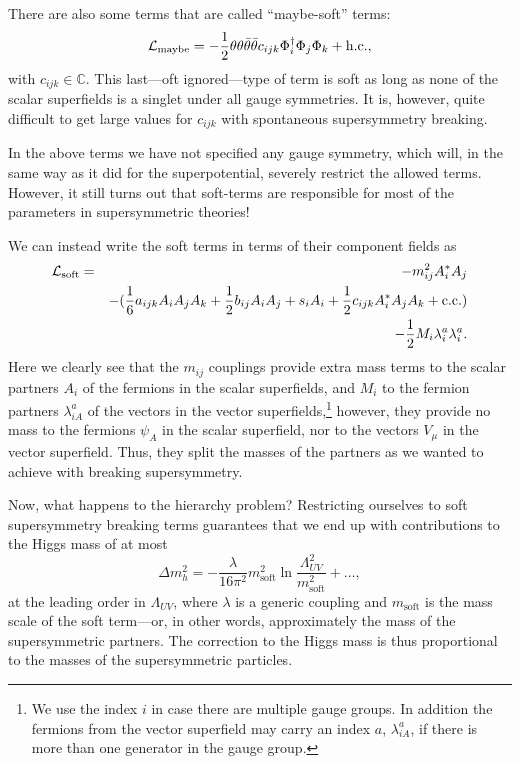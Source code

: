 \documentclass[notes.tex]{subfiles}
\begin{document}
There are also some terms that are called ``maybe-soft'' terms:
\begin{equation}
\mathcal{L}_{\rm maybe} = -\frac{1}{2} \theta\theta\bar{\theta}\bar{\theta}c_{ijk} \Phi_i^\dagger \Phi_j \Phi_k + {\rm h.c.},
\label{eq:maybesoft}
\end{equation}
with $c_{ijk}\in\mathbb C$. This last---oft ignored---type of term is soft as long as none of the scalar superfields is a singlet under all gauge symmetries. It is, however, quite difficult to get large values for $c_{ijk}$ with spontaneous supersymmetry breaking. 

In the above terms we have not specified any gauge symmetry, which will, in the same way as it did for the superpotential, severely restrict the allowed terms. However, it still turns out that soft-terms are responsible for most of the parameters in supersymmetric theories!

We can instead write the soft terms in terms of their component fields as
\begin{eqnarray}
\mathcal{L}_{\rm soft} &=&  - m_{ij}^2 A_i^*A_j \nonumber\\
&& -(\frac{1}{6}a_{ijk}A_iA_jA_k + \frac{1}{2}b_{ij}A_iA_j + s_i A_i +\frac{1}{2}c_{ijk}A^*_iA_jA_k+\text{c.c.}) \label{eq:soft_terms_component_fields}\\
&& -\frac{1}{2} M_i \lambda_i^a\lambda_i^a . \nonumber
\end{eqnarray}
Here we clearly see that the $m_{ij}$ couplings provide extra mass terms to the scalar partners $A_i$ of the fermions in the scalar superfields, and $M_i$ to the fermion partners $\lambda_{iA}^a$ of the vectors in the vector superfields,\footnote{We use the index $i$ in case there are multiple gauge groups. In addition the fermions from the vector superfield may carry an index $a$, $\lambda_{iA}^a$,  if there is more than one generator in the gauge group.} however, they provide no mass to the fermions $\psi_A$ in the scalar superfield, nor to the vectors $V_\mu$ in the vector superfield. Thus, they split the masses of the partners as we wanted to achieve with breaking supersymmetry.

Now, what happens to the hierarchy problem? Restricting ourselves to soft supersymmetry breaking terms guarantees that we end up with contributions to the Higgs mass of at most
\begin{equation}
\Delta m_h^2 = -\frac{\lambda}{16\pi^2}m_\text{soft}^2\ln\frac{\Lambda_{UV}^2}{m_\text{soft}^2}+\ldots,
\label{eq:higgs_soft_mass}
\end{equation}
at the leading order in $\Lambda_{UV}$, where $\lambda$ is a generic coupling and $m_\text{soft}$ is the mass scale of the soft term---or, in other words, approximately the mass of the supersymmetric partners. The correction to the Higgs mass is thus proportional to the masses of the supersymmetric particles. 
\end{document}

